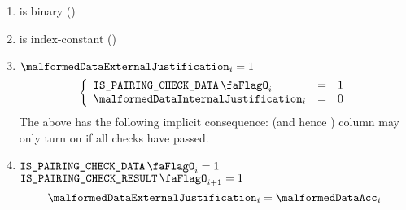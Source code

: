 \begin{enumerate}[resume]
    \item \malformedDataExternalJustification{} is binary \quad (\trash)
    \item \malformedDataExternalJustification{} is index-constant \quad (\trash)
    \item \If $\malformedDataExternalJustification_{i} = 1$ \Then
          \[
              \left\{ \begin{array}{lcl}
                  \isBlsPairingCheckData      _{i} & = & 1 \\
                  \malformedDataInternalJustification _{i} & = & 0 \\
              \end{array} \right.
          \]
          \saNote{} The above has the following implicit consequence: \malformedDataAcc{} (and hence \malformedDataBit{}) column may only turn on if all checks have passed.
    \item \If $\isBlsPairingCheckData _{i} = 1$ \et $\isBlsPairingCheckResult _{i + 1} = 1$ \Then
          \[
              \malformedDataExternalJustification_{i} = \malformedDataAcc _{i}
          \]
\end{enumerate}
